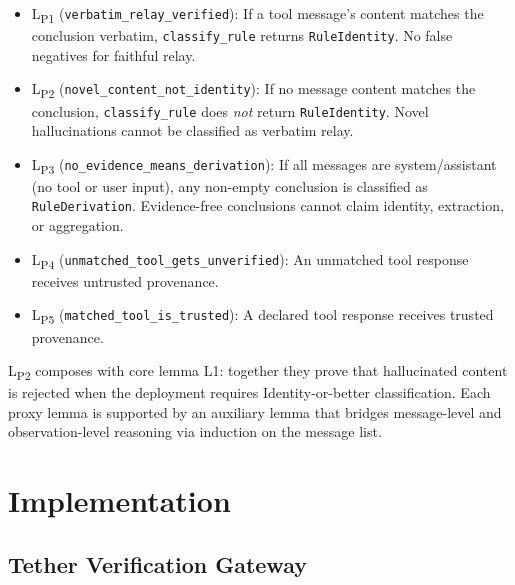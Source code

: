 \documentclass[sigplan,screen,nonacm]{acmart}
\begin{document}
\begin{itemize}
  \item L\textsubscript{P1} (\texttt{verbatim\_relay\_verified}): If a tool
    message's content matches the conclusion verbatim, \texttt{classify\_rule}
    returns \texttt{RuleIdentity}. No false negatives for faithful relay.
  \item L\textsubscript{P2} (\texttt{novel\_content\_not\_identity}): If no
    message content matches the conclusion, \texttt{classify\_rule} does
    \emph{not} return \texttt{RuleIdentity}. Novel hallucinations cannot be
    classified as verbatim relay.
  \item L\textsubscript{P3} (\texttt{no\_evidence\_means\_derivation}): If all
    messages are system/assistant (no tool or user input), any non-empty
    conclusion is classified as \texttt{RuleDerivation}. Evidence-free
    conclusions cannot claim identity, extraction, or aggregation.
  \item L\textsubscript{P4} (\texttt{unmatched\_tool\_gets\_unverified}): An unmatched
    tool response receives untrusted provenance.
  \item L\textsubscript{P5} (\texttt{matched\_tool\_is\_trusted}): A declared tool response
    receives trusted provenance.
\end{itemize}

L\textsubscript{P2} composes with core lemma L1: together they prove that
hallucinated content is rejected when the deployment requires Identity-or-better
classification. Each proxy lemma is supported by an auxiliary lemma that
bridges message-level and observation-level reasoning via induction on the
message list.


\section{Implementation}
\label{sec:implementation}

\subsection{Tether Verification Gateway}
\end{document}
